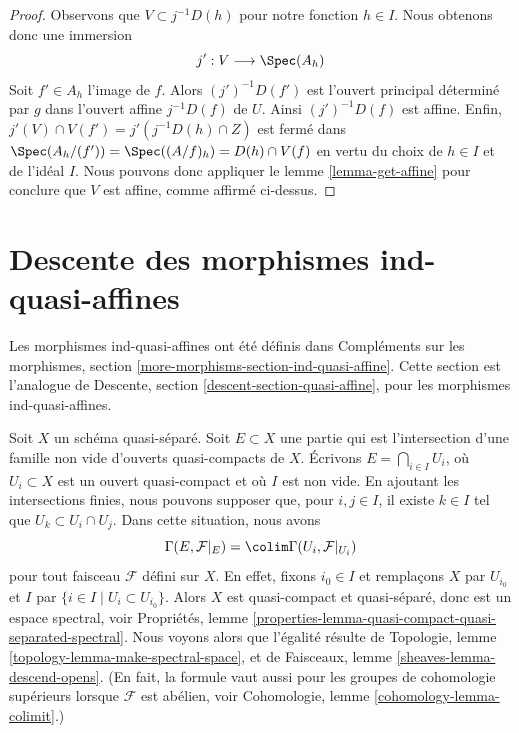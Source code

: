 \begin{proof}
\medskip\noindent
Observons que $V \subset j^{-1}D(h)$ pour notre fonction $h \in I$.
Nous obtenons donc une immersion
$$
j' : V \longrightarrow \Spec(A_h)
$$
Soit $f' \in A_h$ l'image de $f$. Alors $(j')^{-1}D(f')$
est l'ouvert principal déterminé par $g$ dans l'ouvert
affine $j^{-1}D(f)$ de $U$.
Ainsi $(j')^{-1}D(f)$ est affine. Enfin,
$j'(V) \cap V(f') = j'(j^{-1}D(h) \cap Z)$
est fermé dans $\Spec(A_h/(f')) = \Spec((A/f)_h) = D(h) \cap V(f)$
en vertu du choix de $h \in I$ et de l'idéal $I$. Nous pouvons donc appliquer le
lemme \ref{lemma-get-affine}
pour conclure que $V$ est affine, comme affirmé ci-dessus.
\end{proof}







\section{Descente des morphismes ind-quasi-affines}
\label{section-ind-quasi-affine}

\noindent
Les morphismes ind-quasi-affines ont été définis dans
Compléments sur les morphismes, section \ref{more-morphisms-section-ind-quasi-affine}.
Cette section est l'analogue de
Descente, section \ref{descent-section-quasi-affine},
pour les morphismes ind-quasi-affines.

\medskip\noindent
Soit $X$ un schéma quasi-séparé. Soit $E \subset X$ une partie
qui est l'intersection d'une famille non vide d'ouverts quasi-compacts de $X$.
Écrivons $E = \bigcap_{i \in I} U_i$, où $U_i \subset X$ est un ouvert quasi-compact
et où $I$ est non vide.
En ajoutant les intersections finies, nous pouvons supposer que, pour $i, j \in I$,
il existe $k \in I$ tel que $U_k \subset U_i \cap U_j$.
Dans cette situation, nous avons
\begin{equation}
\label{equation-sections-of-intersection}
\Gamma(E, \mathcal{F}|_E) = \colim \Gamma(U_i, \mathcal{F}|_{U_i})
\end{equation}
pour tout faisceau $\mathcal{F}$ défini sur $X$. En effet, fixons $i_0 \in I$
et remplaçons $X$ par $U_{i_0}$ et $I$ par
$\{i \in I \mid U_i \subset U_{i_0}\}$. Alors $X$ est quasi-compact
et quasi-séparé, donc est un espace spectral, voir
Propriétés, lemme
\ref{properties-lemma-quasi-compact-quasi-separated-spectral}.
Nous voyons alors que l'égalité résulte de
Topologie, lemme \ref{topology-lemma-make-spectral-space}, et de
Faisceaux, lemme \ref{sheaves-lemma-descend-opens}.
(En fait, la formule vaut aussi pour les groupes de cohomologie supérieurs
lorsque $\mathcal{F}$ est abélien, voir
Cohomologie, lemme \ref{cohomology-lemma-colimit}.)

